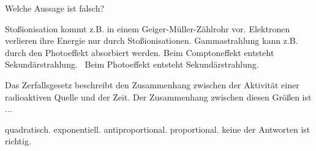 \documentclass[11pt]{exam}
\begin{document}
\begin{questions}
\vspace{3mm}\question Welche Aussage ist falsch?

\begin{choices}
	\choice Stoßionisation kommt z.B. in einem Geiger-Müller-Zählrohr vor.
	\choice Elektronen verlieren ihre Energie nur durch Stoßionisationen.
	\choice Gammastrahlung kann z.B. durch den Photoeffekt absorbiert werden.
	\choice Beim Comptoneffekt entsteht Sekundärstrahlung.
	\choice  Beim Photoeffekt entsteht Sekundärstrahlung.
\end{choices}

\vspace{3mm}\question Das Zerfallsgesetz beschreibt den Zusammenhang zwischen der Aktivität einer radioaktiven Quelle und der Zeit. Der Zusammenhang zwischen diesen Größen ist ...

\begin{choices}
	\choice quadratisch.
	\choice exponentiell.
	\choice antiproportional.
	\choice proportional.
	\choice keine der Antworten ist richtig.
\end{choices}

\vspace{3mm}\end{questions}
\end{document}
